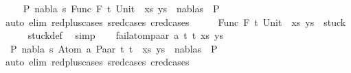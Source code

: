\begin{isabellebody}
\ \ \isamarkupfalse%
\ {\isachardoublequoteopen}{\isasymnot}\ {\isacharparenleft}{\kern0pt}{\isasymexists}P{}\ nabla\ s{\isachardot}{\kern0pt}\ {\isacharparenleft}{\kern0pt}{\isacharparenleft}{\kern0pt}Func\ F\ t{}{\isacharcomma}{\kern0pt}\ Unit{\isacharparenright}{\kern0pt}\ {\isacharhash}{\kern0pt}\ xs{\isacharcomma}{\kern0pt}\ ys{\isacharparenright}{\kern0pt}\ {\isasymTurnstile}\ {\isacharparenleft}{\kern0pt}nabla{\isacharcomma}{\kern0pt}s{\isacharparenright}{\kern0pt}\ {\isasymRightarrow}\ P{}{\isacharparenright}{\kern0pt}{\isachardoublequoteclose}\isanewline
\ \ \ \ \isamarkupfalse%
\ {\isacharparenleft}{\kern0pt}auto\ elim{\isacharcolon}{\kern0pt}\ red{\isacharunderscore}{\kern0pt}plus{\isachardot}{\kern0pt}cases\ s{\isacharunderscore}{\kern0pt}red{\isachardot}{\kern0pt}cases\ c{\isacharunderscore}{\kern0pt}red{\isachardot}{\kern0pt}cases{\isacharparenright}{\kern0pt}\isanewline
\ \ \isamarkupfalse%
\ \isamarkupfalse%
\ {\isachardoublequoteopen}{\isacharparenleft}{\kern0pt}{\isacharparenleft}{\kern0pt}Func\ F\ t{}{\isacharcomma}{\kern0pt}\ Unit{\isacharparenright}{\kern0pt}\ {\isacharhash}{\kern0pt}\ xs{\isacharcomma}{\kern0pt}\ ys{\isacharparenright}{\kern0pt}\ {\isasymin}\ stuck{\isachardoublequoteclose}\isanewline
\ \ \ \ \isamarkupfalse%
\ stuck{\isacharunderscore}{\kern0pt}def\ \isamarkupfalse%
\ simp\isanewline
{}\isamarkupfalse%
\isanewline
\ \ \isamarkupfalse%
\ {\isacharparenleft}{\kern0pt}fail{\isacharunderscore}{\kern0pt}atom{\isacharunderscore}{\kern0pt}paar\ a\ t{}\ t{}\ xs\ ys{\isacharparenright}{\kern0pt}\isanewline
\ \ \isamarkupfalse%
\ {\isachardoublequoteopen}{\isasymnot}\ {\isacharparenleft}{\kern0pt}{\isasymexists}P{}\ nabla\ s{\isachardot}{\kern0pt}\ {\isacharparenleft}{\kern0pt}{\isacharparenleft}{\kern0pt}Atom\ a{\isacharcomma}{\kern0pt}\ Paar\ t{}\ t{}{\isacharparenright}{\kern0pt}\ {\isacharhash}{\kern0pt}\ xs{\isacharcomma}{\kern0pt}\ ys{\isacharparenright}{\kern0pt}\ {\isasymTurnstile}\ {\isacharparenleft}{\kern0pt}nabla{\isacharcomma}{\kern0pt}s{\isacharparenright}{\kern0pt}\ {\isasymRightarrow}\ P{}{\isacharparenright}{\kern0pt}{\isachardoublequoteclose}\isanewline
\ \ \ \ \isamarkupfalse%
\ {\isacharparenleft}{\kern0pt}auto\ elim{\isacharcolon}{\kern0pt}\ red{\isacharunderscore}{\kern0pt}plus{\isachardot}{\kern0pt}cases\ s{\isacharunderscore}{\kern0pt}red{\isachardot}{\kern0pt}cases\ c{\isacharunderscore}{\kern0pt}red{\isachardot}{\kern0pt}cases{\isacharparenright}{\kern0pt}\isanewline

\end{isabellebody}
